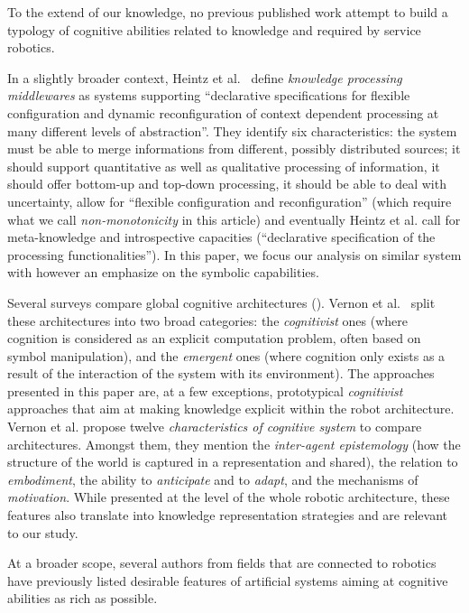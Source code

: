 \documentclass[a4paper, twocolumn]{article}
\begin{document}
To the extend of our knowledge, no previous published work attempt to build a
typology of cognitive abilities related to knowledge and required by service
robotics.

In a slightly broader context, Heintz et al.~\cite{Heintz2008} define
\emph{knowledge processing middlewares} as systems supporting ``declarative
specifications for flexible configuration and dynamic reconfiguration of
context dependent processing at many different levels of abstraction''. They
identify six characteristics: the system must be able to merge informations
from different, possibly distributed sources; it should support quantitative as
well as qualitative processing of information, it should offer bottom-up and
top-down processing, it should be able to deal with uncertainty, allow for
``flexible configuration and reconfiguration'' (which require what we call
\emph{non-monotonicity} in this article) and eventually Heintz et al. call for
meta-knowledge and introspective capacities (``declarative specification of the
processing functionalities''). In this paper, we focus our analysis on similar
system with however an emphasize on the symbolic capabilities.

Several surveys compare global cognitive architectures (\cite{Vernon2007, Chong2009}).
Vernon et al.~\cite{Vernon2007} split these architectures into two broad
categories: the \emph{cognitivist} ones (where cognition is considered as an
explicit computation problem, often based on symbol manipulation), and the
\emph{emergent} ones (where cognition only exists as a result of the
interaction of the system with its environment). The approaches presented in
this paper are, at a few exceptions, prototypical \emph{cognitivist} approaches
that aim at making knowledge explicit within the robot architecture. Vernon et
al. propose twelve \emph{characteristics of cognitive system} to compare
architectures. Amongst them, they mention the \emph{inter-agent epistemology} (how
the structure of the world is captured in a representation and shared), the
relation to \emph{embodiment}, the ability to \emph{anticipate} and to
\emph{adapt}, and the mechanisms of \emph{motivation}. While presented at the
level of the whole robotic architecture, these features also translate into
knowledge representation strategies and are relevant to our study.

At a broader scope, several authors from fields that are connected to robotics
have previously listed desirable features of artificial systems aiming at
cognitive abilities as rich as possible.
\end{document}
